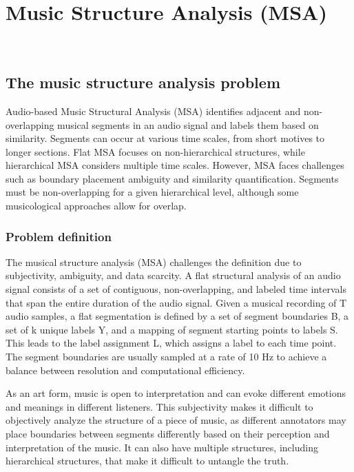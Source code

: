 \chapter{Music Structure Analysis (MSA)}

~\cite{Nieto2020}~\cite{Chaki2021}

\section{The music structure analysis problem}

Audio-based Music Structural Analysis (MSA) identifies adjacent and non-overlapping musical segments in an audio signal and labels them based on similarity. Segments can occur at various time scales, from short motives to longer sections. Flat MSA focuses on non-hierarchical structures, while hierarchical MSA considers multiple time scales. However, MSA faces challenges such as boundary placement ambiguity and similarity quantification. Segments must be non-overlapping for a given hierarchical level, although some musicological approaches allow for overlap.

\subsection{Problem definition}

The musical structure analysis (MSA) challenges the definition due to subjectivity, ambiguity, and data scarcity. A flat structural analysis of an audio signal consists of a set of contiguous, non-overlapping, and labeled time intervals that span the entire duration of the audio signal. Given a musical recording of T audio samples, a flat segmentation is defined by a set of segment boundaries B, a set of k unique labels Y, and a mapping of segment starting points to labels S. This leads to the label assignment L, which assigns a label to each time point. The segment boundaries are usually sampled at a rate of 10 Hz to achieve a balance between resolution and computational efficiency.

As an art form, music is open to interpretation and can evoke different emotions and meanings in different listeners. This subjectivity makes it difficult to objectively analyze the structure of a piece of music, as different annotators may place boundaries between segments differently based on their perception and interpretation of the music. It can also have multiple structures, including hierarchical structures, that make it difficult to untangle the truth.

